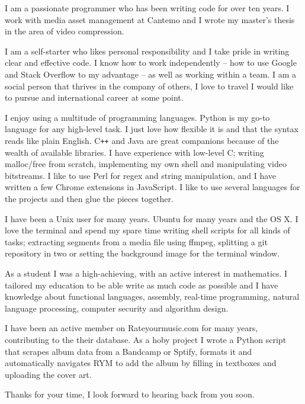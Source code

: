 I am a passionate programmer who has been writing code for over ten years. I work with media asset management at Cantemo and I wrote my master's thesis in the area of video compression.

I am a self-starter who likes personal responsibility and I take pride in writing clear and effective code. I know how to work independently -- how to use Google and Stack Overflow to my advantage -- as well as working within a team. I am a social person that thrives in the company of others, I love to travel I would like to pursue and international career at some point.

I enjoy using a multitude of programming languages. Python is my go-to language for any high-level task. I just love how flexible it is and that the syntax reads like plain English. C\texttt{++} and Java are great companions because of the wealth of available libraries. I have experience with low-level C; writing malloc/free from scratch, implementing my own shell and manipulating video bitstreams. I like to use Perl for regex and string manipulation, and I have written a few Chrome extensions in JavaScript. I like to use several languages for the projects and then glue the pieces together.

I have been a Unix user for many years. Ubuntu for many years and the OS X. I love the terminal and spend my spare time writing shell scripts for all kinds of tasks; extracting segments from a media file using ffmpeg, splitting a git repository in two or setting the background image for the terminal window.

As a student I was a high-achieving, with an active interest in mathematics. I tailored my education to be able write as much code as possible and I have knowledge about functional languages, assembly, real-time programming, natural language processing, computer security and algorithm design.

I have been an active member on Rateyourmusic.com for many years, contributing to the their database. As a hoby project I wrote a Python script that scrapes album data from a Bandcamp or Sptify, formats it and automatically navigates RYM to add the album by filling in textboxes and uploading the cover art.

Thanks for your time, I look forward to hearing back from you soon.
